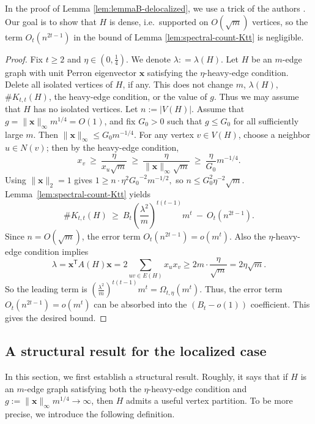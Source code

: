 \documentclass[10pt,a4paper]{amsart}
\newcommand{\Ktt}{K_{t,t}}
\begin{document}
In the proof of Lemma \ref{lem:lemmaB-delocalized}, we use a trick of the authors \cite{LiLiuZhang2025EdgeSpectralESS}. 
Our goal is to show that $H$ is dense, i.e.~supported on \(O(\sqrt m)\) vertices, so the term $O_t(n^{2t-1})$ in the bound of Lemma \ref{lem:spectral-count-Ktt} is negligible. 

\begin{proof} 
Fix $t\ge 2$ and $\eta\in(0,\tfrac14)$. 
We denote $\lambda : =\lambda (H)$. 
Let $H$ be an $m$-edge graph with unit Perron eigenvector $\bm{x}$ satisfying the $\eta$-heavy-edge condition. 
Delete all isolated vertices of \(H\), if any. This does not change \(m\), \(\lambda(H)\), \(\texttt{\#}\Ktt(H)\), the heavy-edge condition, or the value of \(g\). Thus we may assume that \(H\) has no isolated vertices. Let \(n:=|V(H)|\).
Assume that $g=\|\bm{x}\|_\infty m^{1/4}=O(1)$, and fix $G_0>0$ such that $g\le G_0$ for all sufficiently large $m$.
Then $\| \bm{x}\|_\infty\le G_0 m^{-1/4}$. 
For any vertex $v\in V (H)$, choose a neighbor $u\in N(v)$; then by the heavy-edge condition,
\[
  x_v\ \ge\ \frac{\eta}{x_u\sqrt m}\ \ge\ \frac{\eta}{\| \bm{x}\|_\infty\sqrt m}\ \ge\ \frac{\eta}{G_0}m^{-1/4}.
\]
Using $\| \bm{x}\|_2=1$ gives  $1 \ge n \cdot {\eta}^2{G_0}^{-2} m^{-1/2},$ so $
 n \le {G_0^2}{\eta^{-2}}\sqrt m.$
Lemma~\ref{lem:spectral-count-Ktt} yields
\[
  \texttt{\#}\Ktt(H)
  \ \ge\
  B_t\left(\frac{\lambda^2}{m}\right)^{t(t-1)}m^t
  \ -\ O_t\!\left(n ^{2t-1}\right).
\]
Since $n=O(\sqrt m)$, the error term $O_t(n^{2t-1})= o(m^t)$.
Also the $\eta$-heavy-edge condition implies
\[ 
  \lambda =\bm{x}^{\mathsf T}A(H) \bm{x}
  =2\sum_{uv\in E(H)}x_u x_v
  \ge 2m\cdot \frac{\eta}{\sqrt m}
  =2\eta\sqrt m.
\] 
So the leading term is $\left(\frac{\lambda^2}{m}\right)^{t(t-1)}m^t=\Omega_{t,\eta}(m^t).$
Thus, the error term \(O_t(n^{2t-1})=o(m^t)\) can be absorbed into the $(B_t-o(1))$
coefficient. 
This gives the desired bound.
\end{proof}


\subsection{A structural result for the localized case}

In this section, we first establish a structural result. Roughly, it says that if $H$ is an $m$-edge graph satisfying both the $\eta$-heavy-edge condition and $g:=\|\bm{x}\|_{\infty} m^{1/4} \to \infty$,
then $H$ admits a useful vertex partition. 
To be more precise, we introduce the following definition. 
\end{document}
